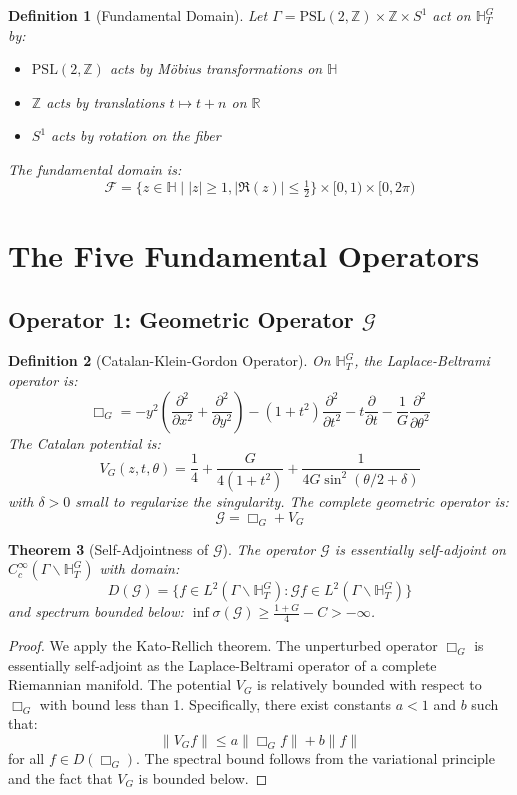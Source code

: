\documentclass[11pt]{article}
\theoremstyle{plain}
\newtheorem{theorem}{Theorem}[section]
\newtheorem{definition}[theorem]{Definition}
\theoremstyle{remark}
\newcommand{\R}{\mathbb{R}}
\newcommand{\Z}{\mathbb{Z}}
\newcommand{\H}{\mathbb{H}}
\newcommand{\PSL}{\mathrm{PSL}}
\newcommand{\spec}{\sigma}
\newcommand{\cG}{\mathcal{G}}
\newcommand{\BoxOp}{\Box}
\newcommand{\Catalan}{G}
\begin{document}
\begin{definition}[Fundamental Domain]
Let $\Gamma = \PSL(2,\Z) \times \Z \times S^1$ act on $\H_T^{\Catalan}$ by:
\begin{itemize}
\item $\PSL(2,\Z)$ acts by Möbius transformations on $\H$
\item $\Z$ acts by translations $t \mapsto t+n$ on $\R$
\item $S^1$ acts by rotation on the fiber
\end{itemize}
The fundamental domain is:
\[
\mathcal{F} = \{z \in \H \mid |z| \geq 1, |\Re(z)| \leq \tfrac12\} \times [0,1) \times [0, 2\pi)
\]
\end{definition}

\section{The Five Fundamental Operators}

\subsection{Operator 1: Geometric Operator $\cG$}

\begin{definition}[Catalan-Klein-Gordon Operator]
On $\H_T^{\Catalan}$, the Laplace-Beltrami operator is:
\[
\BoxOp_{\Catalan} = -y^2\left(\frac{\partial^2}{\partial x^2} + \frac{\partial^2}{\partial y^2}\right) - (1+t^2)\frac{\partial^2}{\partial t^2} - t\frac{\partial}{\partial t} - \frac{1}{\Catalan}\frac{\partial^2}{\partial\theta^2}
\]
The Catalan potential is:
\[
V_{\Catalan}(z,t,\theta) = \frac{1}{4} + \frac{\Catalan}{4(1+t^2)} + \frac{1}{4\Catalan\sin^2(\theta/2 + \delta)}
\]
with $\delta > 0$ small to regularize the singularity. The complete geometric operator is:
\[
\cG = \BoxOp_{\Catalan} + V_{\Catalan}
\]
\end{definition}

\begin{theorem}[Self-Adjointness of $\cG$]
The operator $\cG$ is essentially self-adjoint on $C_c^\infty(\Gamma \backslash \H_T^{\Catalan})$ with domain:
\[
D(\cG) = \{f \in L^2(\Gamma \backslash \H_T^{\Catalan}) : \cG f \in L^2(\Gamma \backslash \H_T^{\Catalan})\}
\]
and spectrum bounded below: $\inf \spec(\cG) \geq \frac{1+\Catalan}{4} - C > -\infty$.
\end{theorem}

\begin{proof}
We apply the Kato-Rellich theorem. The unperturbed operator $\BoxOp_{\Catalan}$ is essentially self-adjoint as the Laplace-Beltrami operator of a complete Riemannian manifold. The potential $V_{\Catalan}$ is relatively bounded with respect to $\BoxOp_{\Catalan}$ with bound less than 1. Specifically, there exist constants $a < 1$ and $b$ such that:
\[
\|V_{\Catalan} f\| \leq a \|\BoxOp_{\Catalan} f\| + b \|f\|
\]
for all $f \in D(\BoxOp_{\Catalan})$. The spectral bound follows from the variational principle and the fact that $V_{\Catalan}$ is bounded below.
\end{proof}
\end{document}
